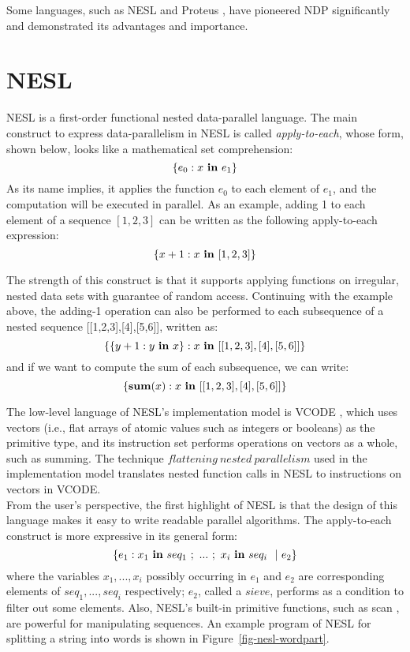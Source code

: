Some languages, such as NESL \cite{blel95nesl,Blel-imp,Blel96-proof} and Proteus \cite{prins93,Ppw95-workeff}, have pioneered NDP significantly and demonstrated its advantages and importance.


\section{NESL}
NESL is a first-order functional nested data-parallel language. The main construct to express data-parallelism in NESL is called \emph{apply-to-each}, whose form, shown below, looks like a mathematical set comprehension:
$$\{e_0 : x \ \*{in} \ e_1 \} $$
As its name implies, it applies the function $e_0$ to each element of $e_1$, and the computation will be executed in parallel.
As an example, adding 1 to each element of a sequence $[1,2,3]$ can be written as the following apply-to-each expression:
$$ \{x+1 : x \ \mathbf{in} \ [1,2,3] \}$$

The strength of this construct is that it supports applying functions on irregular, nested data sets with guarantee of random access. 
Continuing with the example above, the adding-1 operation can also be performed to each subsequence of a nested sequence [[1,2,3],[4],[5,6]], written as: 
$$\{\{y+1: y \ \*{in} \ x\}: x \ \*{in} \ [[1,2,3],[4],[5,6]]\}$$
and if we want to compute the sum of each subsequence, we can write:
$$\{\*{sum}(x) : x \ \*{in} \ [[1,2,3],[4],[5,6]]\}$$



The low-level language of NESL's implementation model is VCODE \cite{Blel-imp}, which uses vectors (i.e., flat arrays of atomic values such as integers or booleans) as the primitive type, and its instruction set performs operations on vectors as a whole, such as summing. 
The technique $ flattening \ nested \ parallelism$ \cite{Blel-flatten} used in the implementation model translates nested function calls in NESL to instructions on vectors in VCODE. \\


From the user's perspective, the first highlight of NESL is that the design of this language makes it easy to write readable parallel algorithms. The apply-to-each construct is more expressive in its general form:
$$ \{ e_1 :  x_1 \ \*{in} \ seq_1 \ ; \ ... \ ; \ x_i \  \*{in} \ seq_i \ \ | \ e_2  \}$$
where the variables $x_1, ...,x_i$ possibly occurring in $e_1$ and $e_2$ are corresponding elements of $seq_1,...,seq_i$ respectively; $e_2$, called a $sieve$, performs as a condition to filter out some elements. 
Also, NESL's built-in primitive functions, such as scan \cite{blel89scan}, are powerful for manipulating sequences.
An example program of NESL for splitting a string into words is shown in Figure~\ref{fig-nesl-wordpart}.


